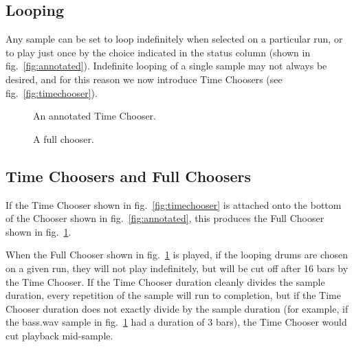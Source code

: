 \documentclass{ppig}
\begin{document}
\hypertarget{looping}{%
\subsection{Looping}\label{looping}}

Any sample can be set to loop indefinitely when selected on a particular
run, or to play just once by the choice indicated in the status column
(shown in fig.~\ref{fig:annotated}). Indefinite looping of a single
sample may not always be desired, and for this reason we now introduce
Time Choosers (see fig.~\ref{fig:timechooser}).

\begin{figure}[!h]
	\begin{floatrow}
			{\caption{An annotated Time Chooser.}\label{fig:timechooser}}
			{\caption{A full chooser.}\label{fig:fullchooser}}
	\end{floatrow}
\end{figure}


\hypertarget{time-choosers-and-full-choosers}{%
\subsection{Time Choosers and Full
Choosers}\label{time-choosers-and-full-choosers}}

If the Time Chooser shown in fig.~\ref{fig:timechooser} is attached onto
the bottom of the Chooser shown in fig.~\ref{fig:annotated}, this
produces the Full Chooser shown in fig.~\ref{fig:fullchooser}.


When the Full Chooser shown in fig.~\ref{fig:fullchooser} is played, if
the looping drums are chosen on a given run, they will not play
indefinitely, but will be cut off after 16 bars by the Time Chooser. If
the Time Chooser duration cleanly divides the sample duration, every
repetition of the sample will run to completion, but if the Time Chooser
duration does not exactly divide by the sample duration (for example, if
the bass.wav sample in fig.~\ref{fig:fullchooser} had a duration of 3
bars), the Time Chooser would cut playback mid-sample.
\end{document}
